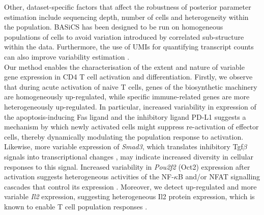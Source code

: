 Other, dataset-specific factors that affect the robustness of posterior parameter estimation include sequencing depth, number of cells and heterogeneity within the population. 
BASiCS has been designed to be run on homogeneous populations of cells to avoid variation introduced by correlated sub-structure within the data. 
Furthermore, the use of UMIs for quantifying transcript counts can also improve variability estimation \citep{Grun2014}. \\

Our method enables the characterisation of the extent and nature of variable gene expression in CD4\plus{} T cell activation and differentiation. 
Firstly, we observe that during acute activation of naive T cells, genes of the biosynthetic machinery are homogeneously up-regulated, while specific immune-related genes are more heterogeneously up-regulated. In particular, increased variability in expression of the apoptosis-inducing Fas ligand \citep{Strasser2009} and the inhibitory ligand PD-L1 \citep{Chikuma2016} suggests a mechanism by which newly activated cells might suppress re-activation of effector cells, thereby dynamically modulating the population response to activation. 
Likewise, more variable expression of \emph{Smad3}, which translates inhibitory \gls{Tgf}$\beta$ signals into transcriptional changes \citep{Delisle2013}, may indicate increased diversity in cellular responses to this signal. 
Increased variability in \textit{Pou2f2} (Oct2) expression after activation suggests heterogeneous activities of the NF-$\kappa$B and/or \gls{NFAT} signalling cascades that control its expression \citep{Mueller2013}.
Moreover, we detect up-regulated and more variable \textit{Il2} expression, suggesting heterogeneous Il2 protein expression, which is known to enable T cell population responses \citep{Fuhrmann2016}. 

